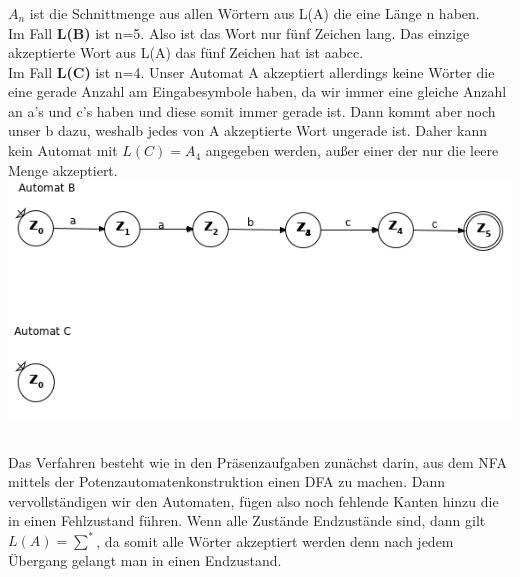 \documentclass[a4paper,12pt]{scrartcl}
\begin{document}
\subsubsection{}
$A_{n}$ ist die Schnittmenge aus allen Wörtern aus L(A) die eine Länge n haben. \\
Im Fall \textbf{L(B)} ist n=5. Also ist das Wort nur fünf Zeichen lang. Das einzige akzeptierte Wort aus L(A) das fünf Zeichen hat ist aabcc.\\
Im Fall \textbf{L(C)} ist n=4. Unser Automat A akzeptiert allerdings keine Wörter die eine gerade Anzahl am Eingabesymbole haben, da wir immer eine gleiche Anzahl an a's und c's haben und diese somit immer gerade ist. Dann kommt aber noch unser b dazu, weshalb jedes von A akzeptierte Wort ungerade ist. Daher kann kein Automat mit $L(C)=A_{4}$ angegeben werden, außer einer der nur die leere Menge akzeptiert.
\includegraphics[scale=0.5]{145.png}
 
\subsection{}
\subsubsection{}
Das Verfahren besteht wie in den Präsenzaufgaben zunächst darin, aus dem NFA mittels der Potenzautomatenkonstruktion einen DFA zu machen. Dann vervollständigen wir den Automaten, fügen also noch fehlende Kanten hinzu die in einen Fehlzustand führen. Wenn alle Zustände Endzustände sind, dann gilt $L(A)=\sum^{*}$, da somit alle Wörter akzeptiert werden denn nach jedem Übergang gelangt man in einen Endzustand.
\end{document}
